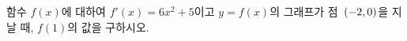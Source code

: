 함수 $f(x)$에 대하여 $f'(x)=6x^2+5$이고 $y=f(x)$의 그래프가 점~$(-2{,}\mkern3mu\mathopen{}0)$을 지날 때, $f(1)$의 값을 구하시오.
